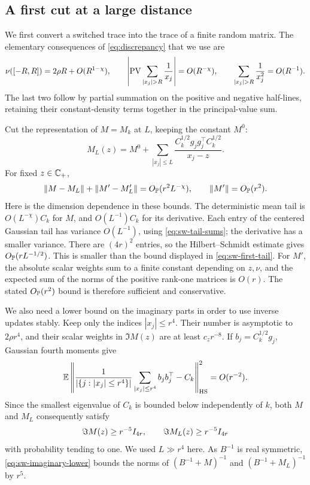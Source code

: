 \subsection{A first cut at a large distance}

We first convert a switched trace into the trace of a finite random matrix.
The elementary consequences of \eqref{eq:discrepancy} that we use are
\begin{equation}\label{eq:sw-tail-sums}
 \nu([-R,R])=2\rho R+O(R^{1-\chi}),\qquad
 \left|\PV\sum_{|x_j|>R}\frac1{x_j}\right|=O(R^{-\chi}),
 \qquad
 \sum_{|x_j|>R}\frac1{x_j^2}=O(R^{-1}).
\end{equation}
The last two follow by partial summation on the positive and negative
half-lines, retaining their constant-density terms together in the
principal-value sum.

Cut the representation of \(M=M_k\) at \(L\), keeping the constant \(M^0\):
\[
 M_L(z)=M^0+
 \sum_{|x_j|\le L}
 \frac{C_k^{1/2}g_jg_j^\top C_k^{1/2}}{x_j-z}.
\]
For fixed \(z\in\mathbb C_+\),
\begin{equation}\label{eq:sw-first-tail}
 \|M-M_L\|+\|M'-M_L'\|=O_{\mathbb P}(r^2L^{-\chi}),
 \qquad \|M'\|=O_{\mathbb P}(r^2).
\end{equation}
Here is the dimension dependence in these bounds. The deterministic mean
tail is \(O(L^{-\chi})C_k\) for \(M\), and \(O(L^{-1})C_k\) for its
derivative. Each entry of the centered Gaussian tail has variance
\(O(L^{-1})\), using \eqref{eq:sw-tail-sums}; the derivative has a smaller
variance. There are \((4r)^2\) entries, so the Hilbert--Schmidt estimate gives
\(O_{\mathbb P}(rL^{-1/2})\). This is smaller than the bound displayed in
\eqref{eq:sw-first-tail}. For \(M'\), the absolute scalar weights sum to a
finite constant depending on \(z,\nu\), and the expected sum of the norms of
the positive rank-one matrices is \(O(r)\). The stated \(O_{\mathbb P}(r^2)\) bound is
therefore sufficient and conservative.

We also need a lower bound on the imaginary parts in order to use inverse
updates stably. Keep only the indices \(|x_j|\le r^4\). Their number is
asymptotic to \(2\rho r^4\), and their scalar weights in \(\Im M(z)\) are at
least \(c_z r^{-8}\). If \(b_j=C_k^{1/2}g_j\), Gaussian fourth moments give
\[
 \mathbb E\left\|
 \frac1{|\{j:|x_j|\le r^4\}|}
 \sum_{|x_j|\le r^4}b_jb_j^\top-C_k
 \right\|_{\mathrm{HS}}^2=O(r^{-2}).
\]
Since the smallest eigenvalue of \(C_k\) is bounded below independently of
\(k\), both \(M\) and \(M_L\) consequently satisfy
\begin{equation}\label{eq:sw-imaginary-lower}
 \Im M(z)\ge r^{-5}I_{4r},\qquad
 \Im M_L(z)\ge r^{-5}I_{4r}
\end{equation}
with probability tending to one. We used \(L\gg r^4\) here.
As \(B^{-1}\) is real symmetric, \eqref{eq:sw-imaginary-lower} bounds the
norms of \((B^{-1}+M)^{-1}\) and \((B^{-1}+M_L)^{-1}\) by \(r^5\).

